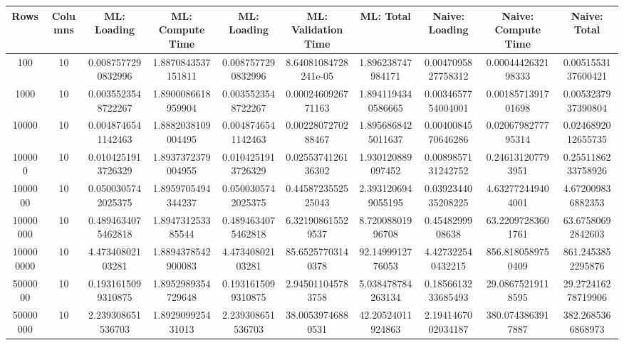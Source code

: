 \begin{table}[htb]
    \centering
    \begin{tabular}{@{}cccccccccc@{}}
        \toprule
        Rows & Columns & ML: Loading & ML: Compute Time & ML: Loading & ML: Validation Time & ML: Total & Naive: Loading & Naive: Compute Time & Naive: Total \\
        \midrule
        100 & 10 & 0.0087577290832996 & 1.8870843537151811 & 0.0087577290832996 & 8.64081084728241e-05 & 1.896238747984171 & 0.0047095827758312 & 0.0004442632198333 & 0.0051553137600421 \\
        1000 & 10 & 0.0035523548722267 & 1.8900086618959904 & 0.0035523548722267 & 0.0002460926771163 & 1.8941194340586665 & 0.0034657754004001 & 0.0018571391701698 & 0.0053237937390804 \\
        10000 & 10 & 0.0048746541142463 & 1.8882038109004495 & 0.0048746541142463 & 0.0022807270288467 & 1.8956868425011637 & 0.0040084570646286 & 0.0206798277795314 & 0.0246892012655735 \\
        100000 & 10 & 0.0104251913726329 & 1.8937372379004955 & 0.0104251913726329 & 0.0255374126136302 & 1.930120889097452 & 0.0089857131242752 & 0.246131207793951 & 0.2551186233758926 \\
        1000000 & 10 & 0.0500305742025375 & 1.8959705494344237 & 0.0500305742025375 & 0.4458723552525043 & 2.3931206949055195 & 0.0392344035208225 & 4.632772449404001 & 4.672009836882353 \\
        10000000 & 10 & 0.4894634075462818 & 1.894731253385544 & 0.4894634075462818 & 6.321908615529537 & 8.72008801996708 & 0.4548299908638 & 63.22097283601761 & 63.67580692842603 \\
        100000000 & 10 & 4.47340802103281 & 1.8894378542900083 & 4.47340802103281 & 85.65257703140378 & 92.1499912776053 & 4.427322540432215 & 856.8180589750409 & 861.2453852295876 \\
        5000000 & 10 & 0.1931615099310875 & 1.8952989354729648 & 0.1931615099310875 & 2.945011045783758 & 5.038478784263134 & 0.1856613233685493 & 29.08675219118595 & 29.272416278719906 \\
        50000000 & 10 & 2.239308651536703 & 1.892909925431013 & 2.239308651536703 & 38.00539746880531 & 42.20524011924863 & 2.1941467002034187 & 380.0743863917887 & 382.2685366868973 \\
        \bottomrule
    \end{tabular}
\end{table}